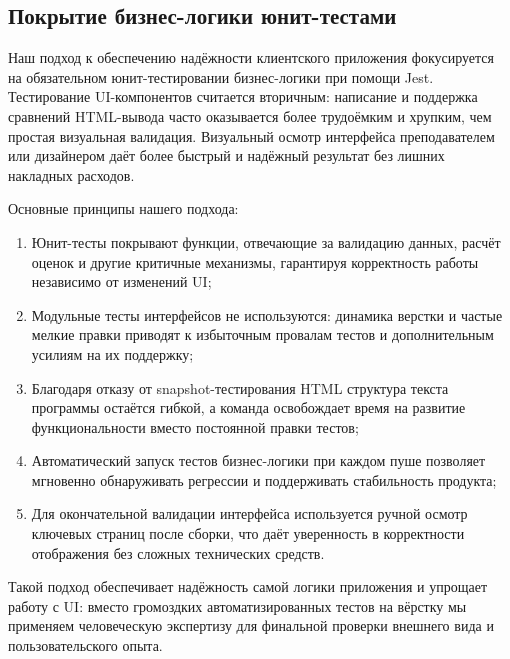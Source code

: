 \subsection{Покрытие бизнес-логики юнит-тестами}

Наш подход к обеспечению надёжности клиентского приложения фокусируется на обязательном юнит-тестировании бизнес-логики при помощи Jest. Тестирование UI-компонентов считается вторичным: написание и поддержка сравнений HTML-вывода часто оказывается более трудоёмким и хрупким, чем простая визуальная валидация. Визуальный осмотр интерфейса преподавателем или дизайнером даёт более быстрый и надёжный результат без лишних накладных расходов.

Основные принципы нашего подхода:
\begin{enumerate}
  \item Юнит-тесты покрывают функции, отвечающие за валидацию данных, расчёт оценок и другие критичные механизмы, гарантируя корректность работы независимо от изменений UI;
  \item Модульные тесты интерфейсов не используются: динамика верстки и частые мелкие правки приводят к избыточным провалам тестов и дополнительным усилиям на их поддержку;
  \item Благодаря отказу от snapshot-тестирования HTML структура текста программы остаётся гибкой, а команда освобождает время на развитие функциональности вместо постоянной правки тестов;
  \item Автоматический запуск тестов бизнес-логики при каждом пуше позволяет мгновенно обнаруживать регрессии и поддерживать стабильность продукта;
  \item Для окончательной валидации интерфейса используется ручной осмотр ключевых страниц после сборки, что даёт уверенность в корректности отображения без сложных технических средств.
\end{enumerate}

Такой подход обеспечивает надёжность самой логики приложения и упрощает работу с UI: вместо громоздких автоматизированных тестов на вёрстку мы применяем человеческую экспертизу для финальной проверки внешнего вида и пользовательского опыта.
